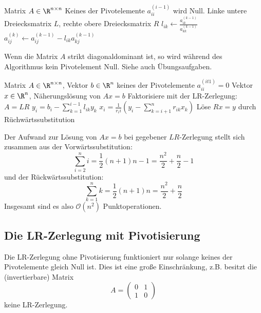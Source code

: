 \documentclass[a4paper]{scrartcl}
\numberwithin{equation}{section}
\begin{document}
\begin{alg}[LR-Zerlegung]
\label{alg:3.5}
\begin{algorithmic}
	\Input Matrix $A\in \R^{n\times n}$
	\Assert Keines der Pivotelemente $a_{ii}^{(i-1)}$ wird Null.
	\Output Linke untere Dreiecksmatrix $L$, rechte obere Dreiecksmatrix $R$
	\Statex
			\State $l_{ik} \gets \frac{a_{ik}^{(k-1)}}{a_{kk}^{(k-1)}}$
		\EndFor
			\State $a_{ij}^{(k)} \gets a_{ij}^{(k-1)} - l_{ik} a_{kj}^{(k-1)}$
		\EndFor
	\EndFor
\end{algorithmic}

\begin{note}
	Wenn die Matrix $A$ strikt diagonaldominant ist, so wird während des Algorithmus kein Pivotelement Null.
	Siehe auch Übungsaufgaben.
\end{note}
\end{alg}


\begin{alg}[Gaußalgorithmus]
	\label{3.6}
	\begin{algorithmic}
		\Input Matrix $A\in \R^{n\times n}$, Vektor $b\in \R^n$
		\Assume keines der Pivotelemente $a_{ii}^{(it1)}=0$
		\Output Vektor $x\in \R^n$, Näherungslösung von $Ax=b$
		\Statex
		\State Faktorisiere mit der LR-Zerlegung: $A =LR$
			\State $\displaystyle y_i = b_i - \sum_{k=1}^{i-1} l_{ik}y_k$
		\EndFor
			\State $\displaystyle x_i = \frac 1{r_ii} \left(y_i -\sum_{k=i+1}^n r_{ik} x_k\right)$
			\Comment Löse $Rx=y$ durch Rüchwärtssubstitution
		\EndFor
	\end{algorithmic}

	Der Aufwand zur Lösung von $Ax=b$ bei gegebener $LR$-Zerlegung stellt sich zusammen aus der Vorwärtssubstitution:
	\[
	\sum_{i=2}^ni = \frac 12 (n+1)n-1 = \frac {n^2}2 +\frac n2 -1
	\]
	und der Rückwärtssubstitution:
	\[
	\sum_{k=1}^nk = \frac 12 (n+1)n = \frac {n^2}2 +\frac n2
	\]
	Insgesamt sind es also $\mathcal O(n^2)$ Punktoperationen.
\end{alg}

\subsection{Die LR-Zerlegung mit Pivotisierung}

Die LR-Zerlegung ohne Pivotisierung funktioniert nur solange keines der Pivotelemente gleich Null ist.
Dies ist eine große Einschränkung, z.B. besitzt die (invertierbare) Matrix
\[
A=\begin{pmatrix}0&1\\1&0\end{pmatrix}
\]
keine LR-Zerlegung.
\end{document}
